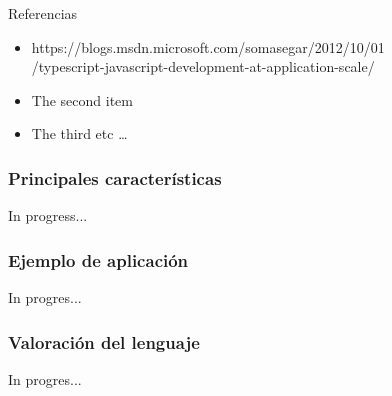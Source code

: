 \documentclass{beamer}
\begin{document}
\small
\begin{frame}{Referencias}
\begin{itemize}  
	\item https://blogs.msdn.microsoft.com/somasegar/2012/10/01 \\ /typescript-javascript-development-at-application-scale/
	\item The second item 
	\item The third etc \ldots 
\end{itemize}

\end{frame}

  \begin{frame}
\frametitle{Principales características}
In progress...
\end{frame}

\begin{frame}
\frametitle{Ejemplo de aplicación}
In progres...
\end{frame}

\begin{frame}
\frametitle{Valoración del lenguaje}
In progres...
\end{frame}
\end{document}
